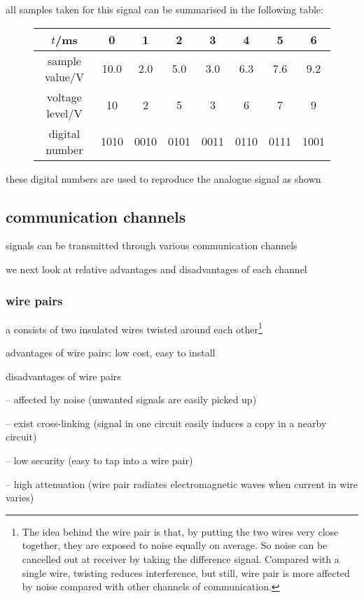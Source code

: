 all samples taken for this signal can be summarised in the following table:

\begin{figure}[ht]
	\centering
	\begin{tabular}{|c|c|c|c|c|c|c|c|}
		\hline
		$t$/ms & 0 & 1 & 2 & 3 & 4 & 5 & 6 \\ \hline
		sample value/V & 10.0 & 2.0 & 5.0 & 3.0 & 6.3 & 7.6 & 9.2 \\ \hline
		voltage level/V & 10 & 2 & 5 & 3 & 6 & 7 & 9 \\ \hline
		digital number & 1010 & 0010 & 0101 & 0011 & 0110 & 0111 & 1001 \\ \hline
	\end{tabular}
\end{figure}

these digital numbers are used to reproduce the analogue signal as shown \eoe






\subsection{communication channels}

signals can be transmitted through various communication channels

we next look at relative advantages and disadvantages of each channel

\subsubsection{wire pairs}

a  consists of two insulated wires twisted around each other\footnote{The idea behind the wire pair is that, by putting the two wires very close together, they are exposed to noise equally on average. So noise can be cancelled out at receiver by taking the difference signal. Compared with a single wire, twisting reduces interference, but still, wire pair is more affected by noise compared with other channels of communication.}

\cmt advantages of wire pairs: low cost, easy to install

\cmt disadvantages of wire pairs

\begin{compactitem}
	\item[--] affected by noise (unwanted signals are easily picked up)
	
	\item[--] exist cross-linking (signal in one circuit easily induces a copy in a nearby circuit)
	
	\item[--] low security (easy to tap into a wire pair)
	
	\item[--] high attenuation (wire pair radiates electromagnetic waves when current in wire varies)
\end{compactitem}

